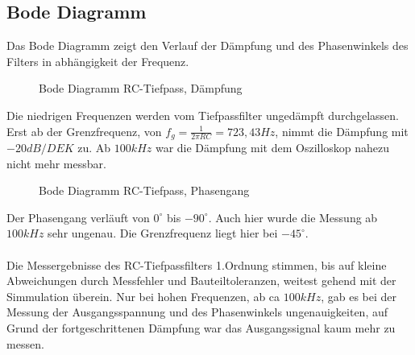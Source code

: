\subsection{Bode Diagramm}

Das Bode Diagramm zeigt den Verlauf der Dämpfung und des Phasenwinkels des Filters in abhängigkeit der Frequenz.\\
\begin{figure}[H]
  \centering
  \caption{Bode Diagramm RC-Tiefpass, Dämpfung}
\end{figure}
\noindent
Die niedrigen Frequenzen werden vom Tiefpassfilter ungedämpft durchgelassen. Erst ab der Grenzfrequenz, von $f_g = \frac{1}{2\pi RC} = 723,43Hz$, nimmt die Dämpfung
mit $-20dB/DEK$ zu. Ab $100kHz$ war die Dämpfung mit dem Oszilloskop nahezu nicht mehr messbar. \\

\begin{figure}[H]
  \centering
  \caption{Bode Diagramm RC-Tiefpass, Phasengang}
\end{figure}
\noindent
Der Phasengang verläuft von $0^\circ$ bis $-90^\circ$. Auch hier wurde die Messung ab $100kHz$ sehr ungenau. Die Grenzfrequenz liegt hier bei $-45^\circ$.\\
\\
Die Messergebnisse des RC-Tiefpassfilters 1.Ordnung stimmen, bis auf kleine Abweichungen durch Messfehler und Bauteiltoleranzen, weitest gehend mit der Simmulation überein. 
Nur bei hohen Frequenzen, ab ca $100kHz$, gab es bei der Messung der Ausgangsspannung und des Phasenwinkels ungenauigkeiten, auf Grund der fortgeschrittenen Dämpfung war das
Ausgangssignal kaum mehr zu messen. \\